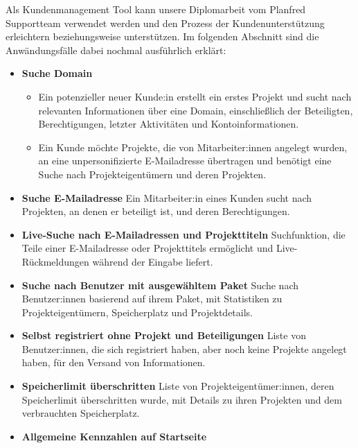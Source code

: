 Als Kundenmanagement Tool kann unsere Diplomarbeit vom Planfred Supportteam verwendet werden und den Prozess der Kundenunterstützung erleichtern beziehungsweise unterstützen.
Im folgenden Abschnitt sind die Anwändungsfälle dabei nochmal ausführlich erklärt:

\begin{itemize}
    \item \textbf{Suche Domain}
        \begin{itemize}
            \item Ein potenzieller neuer Kunde:in erstellt ein erstes Projekt und sucht nach relevanten Informationen über eine Domain, einschließlich der Beteiligten, Berechtigungen, letzter Aktivitäten und Kontoinformationen.
            \item  Ein Kunde möchte Projekte, die von Mitarbeiter:innen angelegt wurden, an eine unpersonifizierte E-Mailadresse übertragen und benötigt eine Suche nach Projekteigentümern und deren Projekten.
        \end{itemize}
    \item \textbf{Suche E-Mailadresse}
        \newline
        Ein Mitarbeiter:in eines Kunden sucht nach Projekten, an denen er beteiligt ist, und deren Berechtigungen.
    \item \textbf{Live-Suche nach E-Mailadressen und Projekttiteln}
        \newline
        Suchfunktion, die Teile einer E-Mailadresse oder Projekttitels ermöglicht und Live-Rückmeldungen während der Eingabe liefert.
    \item \textbf{Suche nach Benutzer mit ausgewähltem Paket}
        \newline
        Suche nach Benutzer:innen basierend auf ihrem Paket, mit Statistiken zu Projekteigentümern, Speicherplatz und Projektdetails.
    \item \textbf{Selbst registriert ohne Projekt und Beteiligungen}
        \newline
        Liste von Benutzer:innen, die sich registriert haben, aber noch keine Projekte angelegt haben, für den Versand von Informationen.
    \item \textbf{Speicherlimit überschritten}
        \newline
        Liste von Projekteigentümer:innen, deren Speicherlimit überschritten wurde, mit Details zu ihren Projekten und dem verbrauchten Speicherplatz.
    \item \textbf{Allgemeine Kennzahlen auf Startseite}

\end{itemize}
